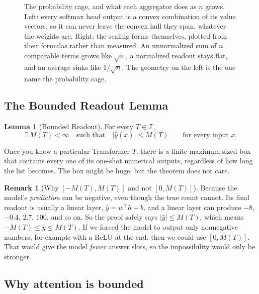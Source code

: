 \documentclass[10pt]{article}
\theoremstyle{definition}
\newtheorem{lemma}{Lemma}
\newtheorem{remark}{Remark}
\begin{document}
\begin{figure}[htbp]
\centering

\caption{The probability cage, and what each aggregator does as $n$ grows.
Left: every softmax head output is a convex combination of its value
vectors, so it can never leave the convex hull they span, whatever the
weights are. Right: the scaling forms themselves, plotted from their
formulas rather than measured. An unnormalized sum of $n$ comparable terms
grows like $\sqrt{n}$, a normalized readout stays flat, and an average sinks
like $1/\sqrt{n}$. The geometry on the left is the one
\citet{richter2020cage} name the probability cage.}
\label{fig:aggregators}
\end{figure}

\subsection{The Bounded Readout Lemma}

\begin{lemma}[Bounded Readout]
\label{lem:bounded}
For every $T \in \mathcal{T}$,
\begin{equation}
\exists\, M(T) < \infty \quad\text{such that}\quad |\hat{y}(x)| \leq M(T)
\qquad\text{for every input } x .
\label{eq:bounded}
\end{equation}
\end{lemma}

Once you know a particular Transformer $T$, there is a finite maximum-sized
box that contains every one of its one-shot numerical outputs, regardless
of how long the list becomes. The box might be huge, but the theorem does
not care.

\begin{remark}[{Why $[-M(T), M(T)]$ and not $[0, M(T)]$}]
\label{rem:whysymmetric}
Because the model's \emph{prediction} can be negative, even though the
true count cannot. Its final readout is usually a linear layer,
$\hat{y} = w^{\top}h + b$, and a linear layer can produce $-8$, $-0.4$,
$2.7$, $100$, and so on. So the proof safely says $|\hat{y}| \leq M(T)$,
which means $-M(T) \leq \hat{y} \leq M(T)$. If we forced the model to
output only nonnegative numbers, for example with a ReLU at the end, then
we could use $[0, M(T)]$. That would give the model \emph{fewer}
answer slots, so the impossibility would only be stronger.
\end{remark}

\subsection{Why attention is bounded}
\label{sec:why-bounded}
\end{document}

